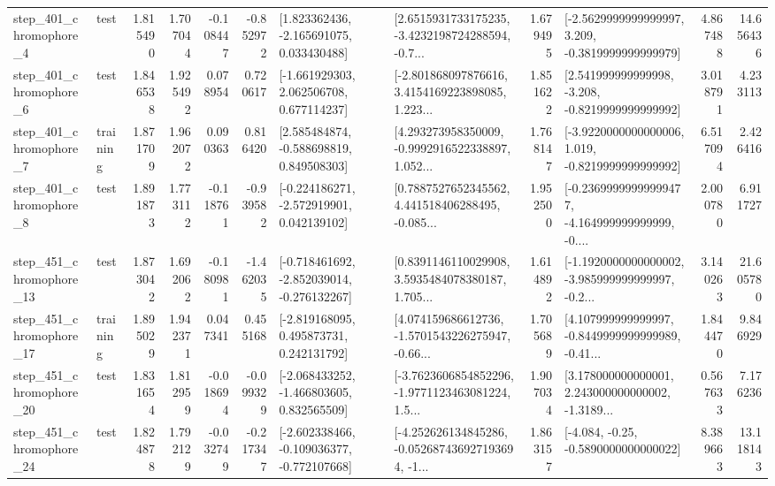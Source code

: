 \begin{tabular}{llrrrrllrlrr}
   step\_401\_chromophore\_4 &      test &      1.815490 &    1.707044 &     -0.108447 & -0.852972 &    [1.823362436, -2.165691075, 0.033430488] &  [2.6515931733175235, -3.4232198724288594, -0.7... &       1.679495 &  [-2.5629999999999997, 3.209, -0.3819999999999979] &            4.867488 &         14.656436 \\
   step\_401\_chromophore\_6 &      test &      1.846538 &    1.925492 &      0.078954 &  0.720617 &    [-1.661929303, 2.062506708, 0.677114237] &  [-2.801868097876616, 3.4154169223898085, 1.223... &       1.851622 &   [2.541999999999998, -3.208, -0.8219999999999992] &            3.018791 &          4.233113 \\
   step\_401\_chromophore\_7 &  training &      1.871709 &    1.962072 &      0.090363 &  0.816420 &    [2.585484874, -0.588698819, 0.849508303] &  [4.293273958350009, -0.9992916522338897, 1.052... &       1.768147 &  [-3.9220000000000006, 1.019, -0.8219999999999992] &            6.517094 &          2.426416 \\
   step\_401\_chromophore\_8 &      test &      1.891873 &    1.773112 &     -0.118761 & -0.939582 &   [-0.224186271, -2.572919901, 0.042139102] &  [0.7887527652345562, 4.441518406288495, -0.085... &       1.952500 &  [-0.23699999999999477, -4.164999999999999, -0.... &            2.000780 &          6.911727 \\
  step\_451\_chromophore\_13 &      test &      1.873042 &    1.692062 &     -0.180981 & -1.462035 &  [-0.718461692, -2.852039014, -0.276132267] &  [0.8391146110029908, 3.5935484078380187, 1.705... &       1.614892 &  [-1.1920000000000002, -3.985999999999997, -0.2... &            3.140263 &         21.605780 \\
  step\_451\_chromophore\_17 &  training &      1.895029 &    1.942371 &      0.047341 &  0.455168 &    [-2.819168095, 0.495873731, 0.242131792] &  [4.074159686612736, -1.5701543226275947, -0.66... &       1.705689 &  [4.107999999999997, -0.8449999999999989, -0.41... &            1.844470 &          9.846929 \\
  step\_451\_chromophore\_20 &      test &      1.831654 &    1.812959 &     -0.018694 & -0.099329 &   [-2.068433252, -1.466803605, 0.832565509] &  [-3.7623606854852296, -1.9771123463081224, 1.5... &       1.907034 &  [3.178000000000001, 2.243000000000002, -1.3189... &            0.567633 &          7.176236 \\
  step\_451\_chromophore\_24 &      test &      1.824878 &    1.792129 &     -0.032749 & -0.217347 &  [-2.602338466, -0.109036377, -0.772107668] &  [-4.252626134845286, -0.052687436927193694, -1... &       1.863157 &               [-4.084, -0.25, -0.5890000000000022] &            8.389663 &         13.118143 \\

\end{tabular}
